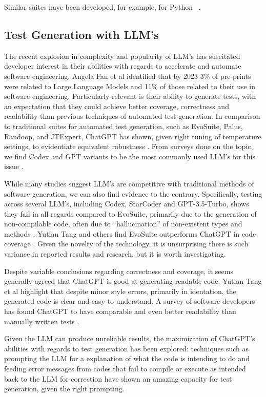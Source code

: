 Similar suites have been developed, for example, for Python ~\citep{kn:pynguin}.

\subsection{Test Generation with LLM's}

The recent explosion in complexity and popularity of LLM's has suscitated developer interest in their abilities with regards to accelerate and automate software engineering. Angela Fan et al identified that by 2023 3\% of pre-prints were related to Large Language Models and 11\% of those related to their use in software engineering\cite{kn:angela}. Particularly relevant is their ability to generate tests, with an expectation that they could achieve better coverage, correctness and readability than previous techniques of automated test generation\cite{kn:junjiewang}.
In comparison to traditional suites for automated test generation, such as EvoSuite, Palus, Randoop, and JTExpert, ChatGPT has shown, given right tuning of temperature settings, to evidentiate equivalent robustness \cite{kn:gptunitbra}.
From surveys done on the topic, we find Codex and GPT variants to be the most commonly used LLM's for this issue \cite{kn:junjiewang}.

While many studies suggest LLM's are competitive with traditional methods of software generation, we can also find evidence to the contrary. Specifically, testing across several LLM's, including Codex, StarCoder and GPT-3.5-Turbo, shows they fail in all regards compared to EvoSuite, primarily due to the generation of non-compilable code, often due to ``hallucination'' of non-existent types and methods \citep{kn:siddiq2023empirical}. Yutian Tang and others find EvoSuite outperforms ChatGPT in code coverage \citep{kn:tang2023chatgpt}. Given the novelty of the technology, it is unsurprising there is such variance in reported results and research, but it is worth investigating.

Despite variable conclusions regarding correctness and coverage, it seems generally agreed that ChatGPT is good at generating readable code. Yutian Tang et al highlight that despite minor style errors, primarily in identation, the generated code is clear and easy to understand\citep{kn:tang2023chatgpt}. A survey of software developers has found ChatGPT to have comparable and even better readability than manually written tests \citep{kn:chattester}.


Given the LLM can produce unreliable results, the maximization of ChatGPT's abilities with regards to test generation has been explored: techniques such as prompting the LLM for a explanation of what the code is intending to do \cite{kn:nuances} and feeding error messages from codes that fail to compile or execute as intended back to the LLM for correction \cite{kn:chattester} have shown an amazing capacity for test generation, given the right prompting.

